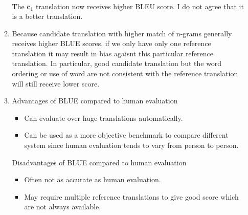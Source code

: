 \documentclass[12pt]{article}
\begin{document}
\begin{enumerate}[label=(\alph*)]
\begin{enumerate}[label=\roman*]
\begin{align*}
  \end{align*}
  The $\mathbf{c}_1$ translation now receives higher BLEU score. I do not agree that it is a better translation.
\item
  Because candidate translation with higher match of n-grams generally receives higher BLUE scores, if we only have only one reference translation it may result in bias agaisnt this particular reference translation. In particular, good candidate translation but the word ordering or use of word are not consistent with the reference translation will still receive lower score.
\item
Advantages of BLUE compared to human evaluation
\begin{itemize}
  \item
  Can evaluate over huge translations automatically.
  \item
  Can be used as a more objective benchmark to compare different system since human evaluation tends to vary from person to person.
\end{itemize}
Disadvantages of BLUE compared to human evaluation
\begin{itemize}
  \item
  Often not as accurate as human evaluation.
  \item
  May require multiple reference translations to give good score which are not always available.
\end{itemize}

\end{enumerate}
\end{enumerate}
\end{document}
